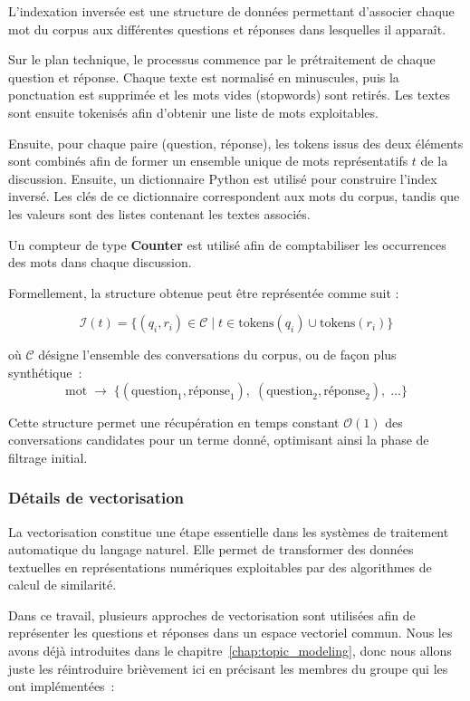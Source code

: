 \documentclass[12pt,a4paper]{report}
\begin{document}
L'indexation inversée est une structure de données permettant d'associer chaque mot du corpus aux différentes questions et réponses dans lesquelles il apparaît.

Sur le plan technique, le processus commence par le prétraitement de chaque question et
réponse. Chaque texte est normalisé en minuscules, puis la ponctuation est supprimée et
les mots vides (stopwords) sont retirés. Les textes sont ensuite tokenisés afin d'obtenir une
liste de mots exploitables.

Ensuite, pour chaque paire (question, réponse), les tokens issus des deux éléments sont combinés
afin de former un ensemble unique de mots représentatifs $t$ de la discussion. Ensuite, un
dictionnaire Python est utilisé pour construire l'index inversé. Les clés de ce dictionnaire
correspondent aux mots du corpus, tandis que les valeurs sont des listes contenant les
textes associés.

Un compteur de type \textbf{Counter} est utilisé afin de comptabiliser les occurrences des mots
dans chaque discussion.

Formellement, la structure obtenue peut être représentée comme suit :

\begin{equation}
\mathcal{I}(t) = \{(q_i, r_i) \in \mathcal{C} \mid t \in \text{tokens}(q_i) \cup \text{tokens}(r_i)\}
\end{equation}

où $\mathcal{C}$ désigne l'ensemble des conversations du corpus, ou de façon plus synthétique~:
\[
\text{mot} \;\longrightarrow\; \{(\text{question}_1, \text{réponse}_1),\; (\text{question}_2, \text{réponse}_2),\; \ldots\}
\]

Cette structure permet une récupération en temps constant $\mathcal{O}(1)$ des conversations candidates pour un terme donné, optimisant ainsi la phase de filtrage initial.

\subsubsection{Détails de vectorisation}

La vectorisation constitue une étape essentielle dans les systèmes de traitement automatique du langage naturel. Elle permet de transformer des données textuelles en représentations numériques exploitables par des algorithmes de calcul de similarité.

Dans ce travail, plusieurs approches de vectorisation sont utilisées afin de représenter les questions et réponses dans un espace vectoriel commun.
Nous les avons déjà introduites dans le chapitre~\ref{chap:topic_modeling}, donc nous allons juste les réintroduire brièvement ici en précisant
les membres du groupe qui les ont implémentées~:
\end{document}
